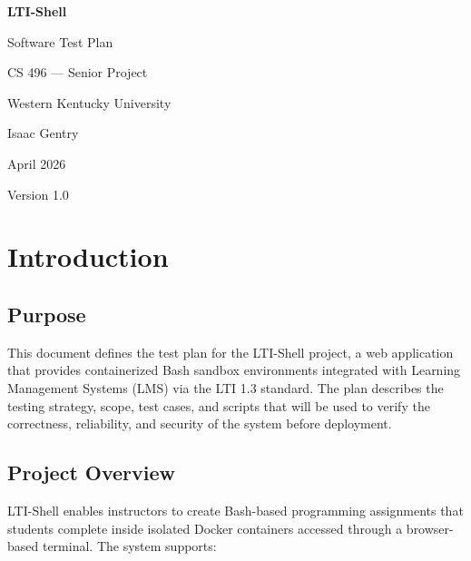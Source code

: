 \documentclass[12pt, letterpaper]{article}
\begin{document}
\begin{titlepage}
    \centering
    \vspace*{2cm}
    {\Huge\bfseries LTI-Shell\par}
    \vspace{0.5cm}
    {\LARGE Software Test Plan\par}
    \vspace{2cm}
    {\Large CS 496 --- Senior Project\par}
    {\Large Western Kentucky University\par}
    \vspace{1.5cm}
    {\large Isaac Gentry\par}
    \vspace{1cm}
    {\large April 2026\par}
    \vfill
    {\normalsize Version 1.0\par}
\end{titlepage}

\newpage
\tableofcontents
\newpage

\section{Introduction}

\subsection{Purpose}
This document defines the test plan for the LTI-Shell project, a web application that provides containerized Bash sandbox environments integrated with Learning Management Systems (LMS) via the LTI 1.3 standard. The plan describes the testing strategy, scope, test cases, and scripts that will be used to verify the correctness, reliability, and security of the system before deployment.

\subsection{Project Overview}
LTI-Shell enables instructors to create Bash-based programming assignments that students complete inside isolated Docker containers accessed through a browser-based terminal. The system supports:
\end{document}
